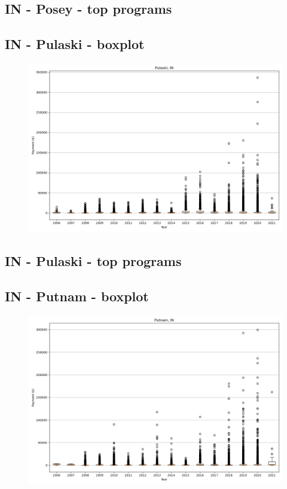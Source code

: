 \subsection*{IN - Posey - top programs}

\newpage
\subsection*{IN - Pulaski - boxplot}
\begin{figure}[h]
\centering
\includegraphics[width=7in]{../output/boxplots/counties/Pulaski-IN_boxplot.png}
\end{figure}


\subsection*{IN - Pulaski - top programs}

\newpage
\subsection*{IN - Putnam - boxplot}
\begin{figure}[h]
\centering
\includegraphics[width=7in]{../output/boxplots/counties/Putnam-IN_boxplot.png}
\end{figure}


